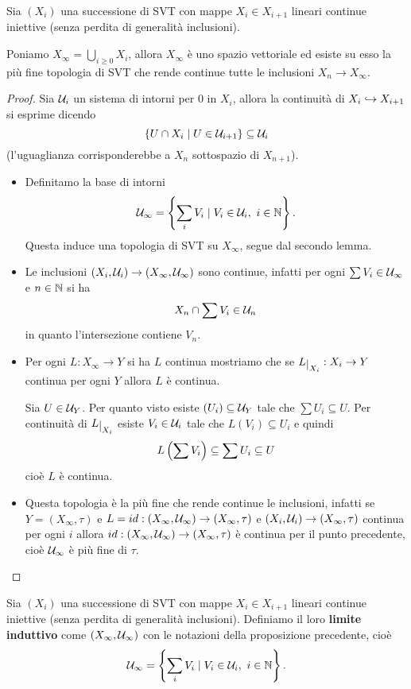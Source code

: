 \begin{proposition}\label{PrLimiteInduttivoDiSVT}
Sia $(X_i)$ una successione di SVT con mappe $X_i\in X_{i+1}$ lineari continue iniettive (senza perdita di generalit\`a inclusioni). 

Poniamo $X_\infty=\bigcup_{i\geq 0}X_i$, allora $X_\infty$ \`e uno spazio vettoriale ed esiste su esso la pi\`u fine topologia di SVT che rende continue tutte le inclusioni $X_n\to X_\infty$.
\end{proposition}
\begin{proof}
Sia $\mathcal{U}_i$ un sistema di intorni per $0$ in $X_i$, allora la continuit\`a di $X_i\hookrightarrow X_{i+1}$ si esprime dicendo
\[\left\{{U\cap X_i\mid U\in \mathcal{U}_{i+1}}\right\}\subseteq \mathcal{U}_{i}\]
(l'uguaglianza corrisponderebbe a $X_n$ sottospazio di $X_{n+1}$).
\begin{itemize}
    \item Definitamo la base di intorni
    \[\Uc_\infty=\cpa{\sum_i V_i\mid V_i\in\Uc_i,\ i\in\N}.\]
    Questa induce una topologia di SVT su $X_\infty$, segue dal secondo lemma.
    \item Le inclusioni $(X_i,\mathcal{U}_i)\to (X_\infty,\mathcal{U}_\infty)$ sono continue, infatti per ogni $\sum V_i\in \mathcal{U}_\infty$ e $n\in\mathbb{N}$ si ha
    \[X_n\cap \sum V_i\in \mathcal{U}_n\]
    in quanto l'intersezione contiene $V_n$.
    \item Per ogni $L:X_\infty\to Y$ si ha $L$ continua mostriamo che se $L\res{X_i}:X_i\to Y$ continua per ogni $Y$ allora $L$ \`e continua.
    
    Sia $U\in \mathcal{U}_Y$. Per quanto visto esiste $(U_i)\subseteq \mathcal{U}_Y$ tale che $\sum U_i\subseteq U$. Per continuit\`a di $L\res{X_i}$ esiste $V_i\in\mathcal{U}_i$ tale che $L(V_i)\subseteq U_i$ e quindi
    \[L\left({\sum V_i}\right)\subseteq \sum U_i\subseteq U\]
    cio\`e $L$ \`e continua.
    \item Questa topologia \`e la pi\`u fine che rende continue le inclusioni, infatti se $Y=(X_\infty,\tau)$ e $L=id:(X_\infty,\mathcal{U}_\infty)\to (X_\infty,\tau)$ e $(X_i,\mathcal{U}_i)\to (X_\infty,\tau)$ continua per ogni $i$ allora $id:(X_\infty,\mathcal{U}_\infty)\to (X_\infty,\tau)$ \`e continua per il punto precedente, cio\`e $\mathcal{U}_\infty$ \`e pi\`u fine di $\tau$.
\end{itemize}
\end{proof}

\begin{definition}
Sia $(X_i)$ una successione di SVT con mappe $X_i\in X_{i+1}$ lineari continue iniettive (senza perdita di generalit\`a inclusioni). Definiamo il loro \textbf{limite induttivo} come $(X_\infty,\mathcal{U}_\infty)$ con le notazioni della proposizione precedente, cio\`e
\[\Uc_\infty=\cpa{\sum_i V_i\mid V_i\in\Uc_i,\ i\in\N}.\]
\end{definition}

